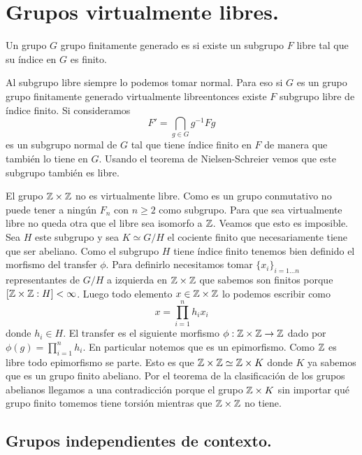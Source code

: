 \documentclass[tesis.tex]{subfiles}
\newcommand{\fg}{grupo finitamente generado }
\newcommand{\vl}{virtualmente libre}
\begin{document}
	
\chapter{Grupos virtualmente libres.}
\begin{deff}
Un grupo $G$ \fg es  si existe un subgrupo $F$ libre tal que su índice en $G$ es finito.
\end{deff}
\begin{obs}
	Al subgrupo libre siempre lo podemos tomar normal.
	Para eso si $G$ es un grupo \fg \vl entonces existe $F$ subgrupo libre de índice finito.
	Si consideramos 
	\[
	F' = \bigcap_{g \in G} g^{-1}Fg
	\]
	es un subgrupo normal de $G$ tal que tiene índice finito en $F$ de manera que también lo tiene en $G$.	
	Usando el teorema de Nielsen-Schreier vemos que este subgrupo también es libre.
\end{obs}

\begin{ej}
	El grupo $\mathbb{Z} \times \mathbb{Z}$ no es virtualmente libre.
	Como es un grupo conmutativo no puede tener a ningún $F_n$ con $n \ge 2$ como subgrupo. 
	Para que sea virtualmente libre no queda otra que el libre sea isomorfo a $\mathbb{Z}$. 
	Veamos que esto es imposible.
	Sea $H$ este subgrupo y sea $K \simeq G/H$ el cociente finito que necesariamente tiene que ser abeliano.
	Como el subgrupo $H$ tiene índice finito tenemos bien definido el morfismo del transfer $\phi$.
	Para definirlo necesitamos tomar $\{ x_i \}_{i=1 \dots n}$ representantes de $G/H$ a izquierda en $\mathbb{Z} \times \mathbb{Z}$ que sabemos son finitos porque $[\mathbb{Z} \times \mathbb{Z} : H] < \infty$.
	Luego todo elemento $x \in \mathbb{Z} \times \mathbb{Z}$ lo podemos escribir como 
	\[
	x = \prod_{i=1}^{n} h_i x_i
	\]
	donde $h_i \in H$.
	El transfer es el siguiente morfismo $\phi: \mathbb{Z} \times \mathbb{Z} \to \mathbb{Z}$ dado por $\phi(g) = \prod_{i=1}^{n} h_i$.
	En particular notemos que es un epimorfismo.
	Como $\mathbb{Z}$ es libre todo epimorfismo se parte. 
	Esto es que $\mathbb{Z} \times \mathbb{Z}  \simeq \mathbb{Z} \times K$ donde $K$ ya sabemos que es un grupo finito abeliano.
	Por el teorema de la clasificación de los grupos abelianos llegamos a una contradicción porque el grupo $\mathbb{Z} \times K$ sin importar qué grupo finito tomemos tiene torsión mientras que $\mathbb{Z} \times \mathbb{Z}$ no tiene.	
\end{ej}






\section{Grupos independientes de contexto.}
 
\end{document}
